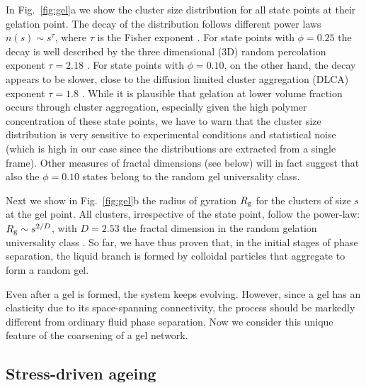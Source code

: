 \documentclass[a4paper,preprint,superscriptaddress]{revtex4}
\begin{document}
In Fig.~\ref{fig:gel}a we show the cluster size distribution for all state points at their gelation point. The decay of the distribution
follows different power laws $n(s)\sim s^\tau$, where $\tau$ is the Fisher exponent \cite{family2012kinetics}.
For state points with $\phi=0.25$ the decay is well described by the three dimensional (3D) random percolation exponent $\tau=2.18$ \cite{family2012kinetics}.
For state points with $\phi=0.10$, on the other hand, the decay appears to be slower, close to the diffusion limited cluster aggregation (DLCA) 
exponent $\tau=1.8$ \cite{family2012kinetics}. While it is plausible that gelation at lower volume fraction occurs through cluster aggregation, especially given 
the high polymer concentration of these state points, we have to warn that the cluster size distribution is very sensitive to
experimental conditions and statistical noise (which is high in our case since the distributions are extracted from a single frame).
Other measures of fractal dimensions (see below) will in fact suggest that also the $\phi=0.10$ states belong to the random gel universality class.

Next we show in Fig.~\ref{fig:gel}b the radius of gyration $R_{\rm g}$ for the clusters of size $s$ at the gel point. All clusters, irrespective
of the state point, follow the power-law: $R_{\rm g}\sim s^{2/D}$, with $D=2.53$ the fractal dimension in the random gelation
universality class \cite{family2012kinetics}. So far, we have thus proven that, in the initial stages of phase separation, the liquid branch is
formed by colloidal particles that aggregate to form a random gel.

Even after a gel is formed, the system keeps evolving.
However, since a gel has an elasticity due to its space-spanning connectivity, the process should be markedly different from 
ordinary fluid phase separation. Now we consider this unique feature of the coarsening of a gel network.  

\subsection*{Stress-driven ageing}
\end{document}
